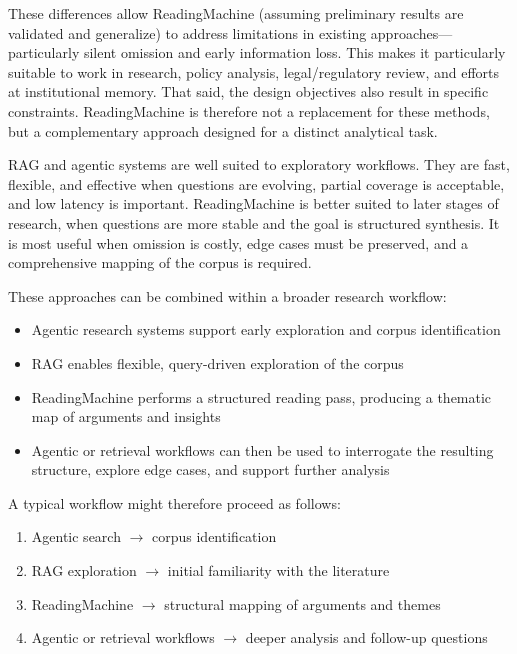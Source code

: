 \documentclass[
  11pt,
]{article}
\providecommand{\tightlist}{%
  \setlength{\itemsep}{0pt}\setlength{\parskip}{0pt}}
\begin{document}
These differences allow ReadingMachine (assuming preliminary results are
validated and generalize) to address limitations in existing
approaches---particularly silent omission and early information loss.
This makes it particularly suitable to work in research, policy
analysis, legal/regulatory review, and efforts at institutional memory.
That said, the design objectives also result in specific constraints.
ReadingMachine is therefore not a replacement for these methods, but a
complementary approach designed for a distinct analytical task.

RAG and agentic systems are well suited to exploratory workflows. They
are fast, flexible, and effective when questions are evolving, partial
coverage is acceptable, and low latency is important. ReadingMachine is
better suited to later stages of research, when questions are more
stable and the goal is structured synthesis. It is most useful when
omission is costly, edge cases must be preserved, and a comprehensive
mapping of the corpus is required.

These approaches can be combined within a broader research workflow:

\begin{itemize}
\tightlist
\item
  Agentic research systems support early exploration and corpus
  identification
\item
  RAG enables flexible, query-driven exploration of the corpus
\item
  ReadingMachine performs a structured reading pass, producing a
  thematic map of arguments and insights
\item
  Agentic or retrieval workflows can then be used to interrogate the
  resulting structure, explore edge cases, and support further analysis
\end{itemize}

A typical workflow might therefore proceed as follows:

\begin{enumerate}
\item Agentic search $\rightarrow$ corpus identification
\item RAG exploration $\rightarrow$ initial familiarity with the literature
\item ReadingMachine $\rightarrow$ structural mapping of arguments and themes
\item Agentic or retrieval workflows $\rightarrow$ deeper analysis and follow-up questions
\end{enumerate}
\end{document}
